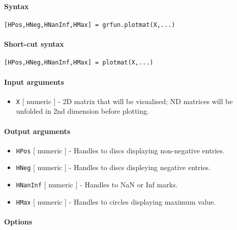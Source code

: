 


	\paragraph{Syntax}\label{syntax}

\begin{verbatim}
[HPos,HNeg,HNanInf,HMax] = grfun.plotmat(X,...)
\end{verbatim}

\paragraph{Short-cut syntax}\label{short-cut-syntax}

\begin{verbatim}
[HPos,HNeg,HNanInf,HMax] = plotmat(X,...)
\end{verbatim}

\paragraph{Input arguments}\label{input-arguments}

\begin{itemize}
\itemsep1pt\parskip0pt
\item
  \texttt{X} {[} numeric {]} - 2D matrix that will be visualised; ND
  matrices will be unfolded in 2nd dimension before plotting.
\end{itemize}

\paragraph{Output arguments}\label{output-arguments}

\begin{itemize}
\item
  \texttt{HPos} {[} numeric {]} - Handles to discs displaying
  non-negative entries.
\item
  \texttt{HNeg} {[} numeric {]} - Handles to discs displeying negative
  entries.
\item
  \texttt{HNanInf} {[} numeric {]} - Handles to NaN or Inf marks.
\item
  \texttt{HMax} {[} numeric {]} - Handles to circles displaying maximum
  value.
\end{itemize}

\paragraph{Options}\label{options}


